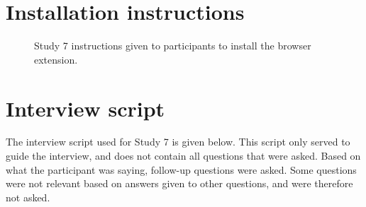 \section{Installation instructions}\label{ch:S7_Instructions}
\begin{figure}[!htp] 
\caption[Study 7 installation instructions]{Study 7 instructions given to participants to install the browser extension.}
\label{fig:ch67-Study7Instructions}
\end{figure} 

\section{ Interview script}
The interview script used for Study 7 is given below. This script only served to guide the interview, and does not contain all questions that were asked.  Based on what the participant was saying, follow-up questions were asked. Some questions were not relevant based on answers given to other questions, and were therefore not asked.

